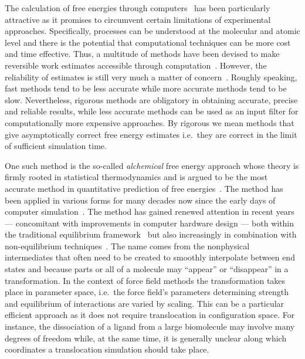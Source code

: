 \documentclass[journal=jctcce,manuscript=article]{achemso}
\begin{document}
The calculation of free energies through
computers~\cite{hansen_practical_2014, doi:10.1021/jp102971x,
  Gallicchio201127, doi:10.1080/08927022.2015.1132317,
  doi:10.1146/annurev.matsci.32.111901.153708} has been particularly
attractive as it promises to circumvent certain limitations of experimental
approaches. Specifically, processes can be understood at the molecular and atomic level and 
there is the potential that computational techniques can be more cost and time effective.  Thus, a
multitude of methods have been devised to make reversible work
estimates accessible through computation~\cite{hansen_practical_2014,
  doi:10.1021/jp102971x, Gallicchio201127,
  doi:10.1080/08927022.2015.1132317,
  doi:10.1146/annurev.matsci.32.111901.153708}.  However, the
reliability of estimates is still very much a matter of
concern~\cite{doi:10.1021/jp102971x, doi:10.1021/acs.jctc.5b00179}.
Roughly speaking, fast methods tend to be less accurate while more
accurate methods tend to be slow.  Nevertheless, rigorous
methods are obligatory in obtaining accurate, precise and reliable
results, while less accurate methods can be used as an input filter
for computationally more expensive approaches.  By rigorous we mean methods 
that give asymptotically correct free energy estimates i.e.\ they are correct 
in the limit of sufficient simulation time.

One such method is the so-called \emph{alchemical} free energy
approach whose theory is firmly rooted in statistical thermodynamics
and is argued to be the most accurate method in quantitative
prediction of free energies~\cite{Beveridge-citeulike:3789890,
  straatsma:92, doi:10.1021/cr00023a004, hansen_practical_2014}.  The
method has been applied in various forms for many decades now since
the early days of computer simulation~\cite{doi:10.1063/1.1671118,
  bennett_efficient_1976, doi:10.1063/1.432264, FS9821700055,
  Tembe1984281, doi:10.1063/1.449208}.  The method has gained renewed
attention in recent years --- concomitant with improvements in
computer hardware design --- both within the traditional equilibrium
framework~\cite{GILSON19971047, doi:10.1021/jp0217839,
  deng_computations_2009} but also increasingly in combination with
non-equilibrium techniques~\cite{ytreberg_comparison_2006, JCC:JCC23804,
  doi:10.1021/ct500964e}.  The name comes from the nonphysical
intermediates that often need to be created to smoothly interpolate
between end states and because parts or all of a molecule may ``appear''
or ``disappear'' in a transformation.  In the context of force field
methods the transformation takes place in parameter space, i.e.\ the
force field's parameters determining strength and equilibrium of
interactions are varied by scaling.  This can be a particular
efficient approach as it does not require translocation in
configuration space.  For instance, the dissociation of a ligand from
a large biomolecule may involve many degrees of freedom while, at the
same time, it is generally unclear along which coordinates a
translocation simulation should take place.
\end{document}

